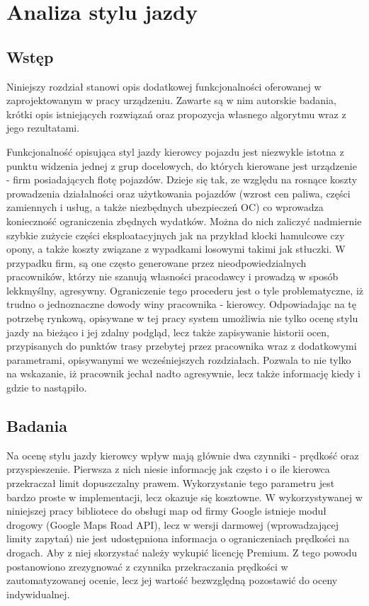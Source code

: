 \chapter{Analiza stylu jazdy}

\section{Wstęp}

Niniejszy rozdział stanowi opis dodatkowej funkcjonalności oferowanej w zaprojektowanym w pracy urządzeniu. Zawarte są w nim autorskie badania, krótki opis istniejących rozwiązań oraz propozycja własnego algorytmu wraz z jego rezultatami. 

Funkcjonalność opisująca styl jazdy kierowcy pojazdu jest niezwykle istotna z punktu widzenia jednej z grup docelowych, do których kierowane jest urządzenie - firm posiadających flotę pojazdów. Dzieje się tak, ze względu na rosnące koszty prowadzenia działalności oraz użytkowania pojazdów (wzrost cen paliwa, części zamiennych i usług, a także niezbędnych ubezpieczeń OC) co wprowadza konieczność ograniczenia zbędnych wydatków. Można do nich zaliczyć nadmiernie szybkie zużycie części eksploatacyjnych jak na przykład klocki hamulcowe czy opony, a także koszty związane z wypadkami losowymi takimi jak stłuczki. W przypadku firm, są one często generowane przez nieodpowiedzialnych pracowników, którzy nie szanują własności pracodawcy i prowadzą w sposób lekkmyślny, agresywny. Ograniczenie tego procederu jest o tyle problematyczne, iż trudno o jednoznaczne dowody winy pracownika - kierowcy. Odpowiadając na tę potrzebę rynkową, opisywane w tej pracy system umożliwia nie tylko ocenę stylu jazdy na bieżąco i jej zdalny podgląd, lecz także zapisywanie historii ocen, przypisanych do punktów trasy przebytej przez pracownika wraz z dodatkowymi parametrami, opisywanymi we wcześniejszych rozdziałach. Pozwala to nie tylko na wskazanie, iż pracownik jechał nadto agresywnie, lecz także informację kiedy i gdzie to nastąpiło.

\section{Badania}

Na ocenę stylu jazdy kierowcy wpływ mają głównie dwa czynniki - prędkość oraz przyspieszenie. Pierwsza z nich niesie informację jak często i o ile kierowca przekraczał limit dopuszczalny prawem. Wykorzystanie tego parametru jest bardzo proste w implementacji, lecz okazuje się kosztowne. W wykorzystywanej w niniejszej pracy bibliotece do obsługi map od firmy Google istnieje moduł drogowy (Google Maps Road API\cite{google_map_road_api}), lecz w wersji darmowej (wprowadzającej limity zapytań) nie jest udostępniona informacja o ograniczeniach prędkości na drogach. Aby z niej skorzystać należy wykupić licencję Premium. Z tego powodu postanowiono zrezygnować z czynnika przekraczania prędkości w zautomatyzowanej ocenie, lecz jej wartość bezwzględną pozostawić do oceny indywidualnej.

